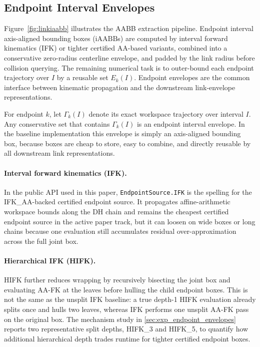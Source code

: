 \documentclass[journal]{IEEEtran}
\newcommand{\iAABB}{\ensuremath{\mathrm{iAABB}}}
\begin{document}
\subsection{Endpoint Interval Envelopes}\label{sec:rewrite_endpoint_env}

\noindent Figure~\ref{fig:linkiaabb} illustrates the AABB extraction pipeline.
Endpoint interval axis-aligned bounding boxes (\iAABB{}s) are computed by
interval forward kinematics (IFK) or tighter certified AA-based variants,
combined into a conservative zero-radius centerline envelope, and padded by the
link radius before collision querying.
The remaining numerical task is to outer-bound each endpoint trajectory over
$I$ by a reusable set $E_k(I)$.
Endpoint envelopes are the common interface between kinematic propagation and
the downstream link-envelope representations.

For endpoint $k$, let $\Gamma_k(I)$ denote its exact workspace trajectory over
interval $I$. Any conservative set that contains $\Gamma_k(I)$ is an endpoint
interval envelope. In the baseline implementation this envelope is simply an
axis-aligned bounding box, because boxes are cheap to store, easy to combine,
and directly reusable by all downstream link representations.

\paragraph{Interval forward kinematics (IFK).}
In the public API used in this paper,
\texttt{EndpointSource.IFK} is the spelling for the IFK\_AA-backed certified
endpoint source. It propagates affine-arithmetic workspace bounds along the DH
chain and remains the cheapest certified endpoint source in the active paper
track, but it can loosen on wide boxes or long chains because one evaluation
still accumulates residual over-approximation across the full joint box.

\paragraph{Hierarchical IFK (HIFK).}
HIFK further reduces wrapping by recursively bisecting the joint box and
evaluating AA-FK at the leaves before hulling the child endpoint boxes. This is
not the same as the unsplit IFK baseline: a true depth-1 HIFK evaluation
already splits once and hulls two leaves, whereas IFK performs one unsplit
AA-FK pass on the original box. The mechanism study in
\cref{sec:exp_endpoint_envelopes} reports two representative split depths, HIFK\_3 and
HIFK\_5, to quantify how additional hierarchical depth trades runtime for
tighter certified endpoint boxes.
\end{document}
